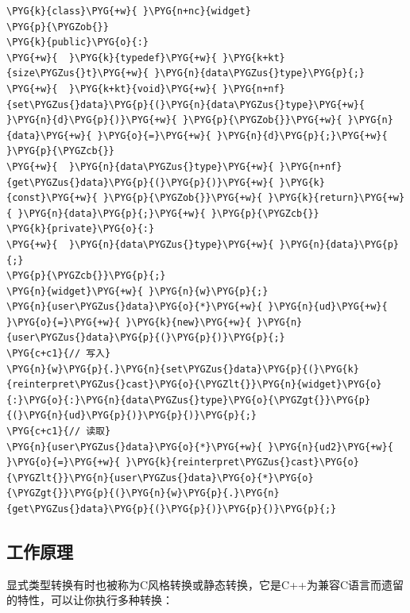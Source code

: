 \begin{itemize}
\begin{codeblockbg}
\begin{Verbatim}[commandchars=\\\{\},breaklines=true,breakanywhere=true,fontsize=\codefont,xleftmargin=17bp]
\PYG{k}{class}\PYG{+w}{ }\PYG{n+nc}{widget}
\PYG{p}{\PYGZob{}}
\PYG{k}{public}\PYG{o}{:}
\PYG{+w}{  }\PYG{k}{typedef}\PYG{+w}{ }\PYG{k+kt}{size\PYGZus{}t}\PYG{+w}{ }\PYG{n}{data\PYGZus{}type}\PYG{p}{;}
\PYG{+w}{  }\PYG{k+kt}{void}\PYG{+w}{ }\PYG{n+nf}{set\PYGZus{}data}\PYG{p}{(}\PYG{n}{data\PYGZus{}type}\PYG{+w}{ }\PYG{n}{d}\PYG{p}{)}\PYG{+w}{ }\PYG{p}{\PYGZob{}}\PYG{+w}{ }\PYG{n}{data}\PYG{+w}{ }\PYG{o}{=}\PYG{+w}{ }\PYG{n}{d}\PYG{p}{;}\PYG{+w}{ }\PYG{p}{\PYGZcb{}}
\PYG{+w}{  }\PYG{n}{data\PYGZus{}type}\PYG{+w}{ }\PYG{n+nf}{get\PYGZus{}data}\PYG{p}{(}\PYG{p}{)}\PYG{+w}{ }\PYG{k}{const}\PYG{+w}{ }\PYG{p}{\PYGZob{}}\PYG{+w}{ }\PYG{k}{return}\PYG{+w}{ }\PYG{n}{data}\PYG{p}{;}\PYG{+w}{ }\PYG{p}{\PYGZcb{}}
\PYG{k}{private}\PYG{o}{:}
\PYG{+w}{  }\PYG{n}{data\PYGZus{}type}\PYG{+w}{ }\PYG{n}{data}\PYG{p}{;}
\PYG{p}{\PYGZcb{}}\PYG{p}{;}
\PYG{n}{widget}\PYG{+w}{ }\PYG{n}{w}\PYG{p}{;}
\PYG{n}{user\PYGZus{}data}\PYG{o}{*}\PYG{+w}{ }\PYG{n}{ud}\PYG{+w}{ }\PYG{o}{=}\PYG{+w}{ }\PYG{k}{new}\PYG{+w}{ }\PYG{n}{user\PYGZus{}data}\PYG{p}{(}\PYG{p}{)}\PYG{p}{;}
\PYG{c+c1}{// 写入}
\PYG{n}{w}\PYG{p}{.}\PYG{n}{set\PYGZus{}data}\PYG{p}{(}\PYG{k}{reinterpret\PYGZus{}cast}\PYG{o}{\PYGZlt{}}\PYG{n}{widget}\PYG{o}{:}\PYG{o}{:}\PYG{n}{data\PYGZus{}type}\PYG{o}{\PYGZgt{}}\PYG{p}{(}\PYG{n}{ud}\PYG{p}{)}\PYG{p}{)}\PYG{p}{;}
\PYG{c+c1}{// 读取}
\PYG{n}{user\PYGZus{}data}\PYG{o}{*}\PYG{+w}{ }\PYG{n}{ud2}\PYG{+w}{ }\PYG{o}{=}\PYG{+w}{ }\PYG{k}{reinterpret\PYGZus{}cast}\PYG{o}{\PYGZlt{}}\PYG{n}{user\PYGZus{}data}\PYG{o}{*}\PYG{o}{\PYGZgt{}}\PYG{p}{(}\PYG{n}{w}\PYG{p}{.}\PYG{n}{get\PYGZus{}data}\PYG{p}{(}\PYG{p}{)}\PYG{p}{)}\PYG{p}{;}
\end{Verbatim}
\end{codeblockbg}

\end{itemize}



\subsection{工作原理}



显式类型转换有时也被称为C风格转换或静态转换，它是C++为兼容C语言而遗留的特性，可以让你执行多种转换：



